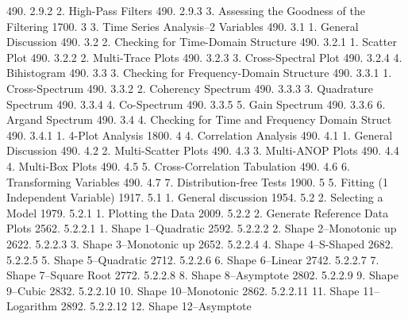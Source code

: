 490.      2.9.2                       2. High-Pass Filters
490.      2.9.3                       3. Assessing the Goodness of the Filtering
1700.     3               3. Time Series Analysis--2 Variables
490.      3.1                   1. General Discussion
490.      3.2                   2. Checking for Time-Domain Structure
490.      3.2.1                       1. Scatter Plot
490.      3.2.2                       2. Multi-Trace Plots
490.      3.2.3                       3. Cross-Spectral Plot
490.      3.2.4                       4. Bihistogram
490.      3.3                   3. Checking for Frequency-Domain Structure
490.      3.3.1                       1. Cross-Spectrum
490.      3.3.2                       2. Coherency Spectrum
490.      3.3.3                       3. Quadrature Spectrum
490.      3.3.4                       4. Co-Spectrum
490.      3.3.5                       5. Gain Spectrum
490.      3.3.6                       6. Argand Spectrum
490.      3.4                   4. Checking for Time and Frequency Domain Struct
490.      3.4.1                       1. 4-Plot Analysis
1800.     4               4. Correlation Analysis
490.      4.1                   1. General Discussion
490.      4.2                   2. Multi-Scatter Plots
490.      4.3                   3. Multi-ANOP Plots
490.      4.4                   4. Multi-Box Plots
490.      4.5                   5. Cross-Correlation Tabulation
490.      4.6                   6. Transforming Variables
490.      4.7                   7. Distribution-free Tests
1900.     5               5. Fitting (1 Independent Variable)
1917.     5.1                   1. General discussion
1954.     5.2                   2. Selecting a Model
1979.     5.2.1                       1. Plotting the Data
2009.     5.2.2                       2. Generate Reference Data Plots
2562.     5.2.2.1                           1. Shape 1--Quadratic
2592.     5.2.2.2                           2. Shape 2--Monotonic up
2622.     5.2.2.3                           3. Shape 3--Monotonic up
2652.     5.2.2.4                           4. Shape 4--S-Shaped
2682.     5.2.2.5                           5. Shape 5--Quadratic
2712.     5.2.2.6                           6. Shape 6--Linear
2742.     5.2.2.7                           7. Shape 7--Square Root
2772.     5.2.2.8                           8. Shape 8--Asymptote
2802.     5.2.2.9                           9. Shape 9--Cubic
2832.     5.2.2.10                         10. Shape 10--Monotonic
2862.     5.2.2.11                         11. Shape 11--Logarithm
2892.     5.2.2.12                         12. Shape 12--Asymptote

